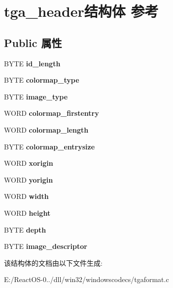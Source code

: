 \hypertarget{structtga__header}{}\section{tga\+\_\+header结构体 参考}
\label{structtga__header}
\subsection*{Public 属性}
\begin{DoxyCompactItemize}
\item 
\mbox{\label{structtga__header_a2563634408825190afb9956fa946cf4b}} 
B\+Y\+TE {\bfseries id\+\_\+length}
\item 
\mbox{\label{structtga__header_a9970e02da2d005b238377b4e971c28bc}} 
B\+Y\+TE {\bfseries colormap\+\_\+type}
\item 
\mbox{\label{structtga__header_ad9bbd673f3ea3b01411bb3683cf15db1}} 
B\+Y\+TE {\bfseries image\+\_\+type}
\item 
\mbox{\label{structtga__header_a9b38b2f34c0774baa154944aad882db3}} 
W\+O\+RD {\bfseries colormap\+\_\+firstentry}
\item 
\mbox{\label{structtga__header_a7593b0cfc6fcd2eabad7a3290d7f4160}} 
W\+O\+RD {\bfseries colormap\+\_\+length}
\item 
\mbox{\label{structtga__header_a724c1c4da476a7a7804a5a74d99c4542}} 
B\+Y\+TE {\bfseries colormap\+\_\+entrysize}
\item 
\mbox{\label{structtga__header_a7677df4deaa7f467a2d5dcbdae7eaa00}} 
W\+O\+RD {\bfseries xorigin}
\item 
\mbox{\label{structtga__header_a5a713a4f74fe52ea9f8ddabba772a137}} 
W\+O\+RD {\bfseries yorigin}
\item 
\mbox{\label{structtga__header_ad1b49efbca3be9636e66e67fcdd428c1}} 
W\+O\+RD {\bfseries width}
\item 
\mbox{\label{structtga__header_a5edf838ed02e3b7681adf1bda00d45d5}} 
W\+O\+RD {\bfseries height}
\item 
\mbox{\label{structtga__header_a2ebf090f5a1f2d05765aa3b9df7faf1f}} 
B\+Y\+TE {\bfseries depth}
\item 
\mbox{\label{structtga__header_a87b12ce5982de3cbb06cf80cc5790bb5}} 
B\+Y\+TE {\bfseries image\+\_\+descriptor}
\end{DoxyCompactItemize}


该结构体的文档由以下文件生成\+:\begin{DoxyCompactItemize}
\item 
E\+:/\+React\+O\+S-\/0../dll/win32/windowscodecs/tgaformat.\+c\end{DoxyCompactItemize}
